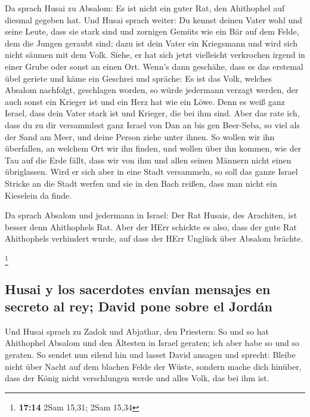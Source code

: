  Da sprach Husai zu Absalom: Es ist nicht ein guter Rat,
den Ahithophel auf diesmal gegeben hat.  Und Husai sprach
weiter: Du kennst deinen Vater wohl und seine Leute, dass sie stark sind
und zornigen Gemüts wie ein Bär auf dem Felde, dem die Jungen geraubt
sind; dazu ist dein Vater ein Kriegsmann und wird sich nicht säumen mit
dem Volk.  Siehe, er hat sich jetzt vielleicht verkrochen
irgend in einer Grube oder sonst an einen Ort. Wenn's dann geschähe,
dass es das erstemal übel geriete und käme ein Geschrei und spräche: Es
ist das Volk, welches Absalom nachfolgt, geschlagen worden,
 so würde jedermann verzagt werden, der auch sonst ein
Krieger ist und ein Herz hat wie ein Löwe. Denn es weiß ganz Israel,
dass dein Vater stark ist und Krieger, die bei ihm sind. 
Aber das rate ich, dass du zu dir versammlest ganz Israel von Dan an bis
gen Beer-Seba, so viel als der Sand am Meer, und deine Person ziehe
unter ihnen.  So wollen wir ihn überfallen, an welchem
Ort wir ihn finden, und wollen über ihn kommen, wie der Tau auf die Erde
fällt, dass wir von ihm und allen seinen Männern nicht einen
übriglassen.  Wird er sich aber in eine Stadt versammeln,
so soll das ganze Israel Stricke an die Stadt werfen und sie in den Bach
reißen, dass man nicht ein Kieselein da finde.

 Da sprach Absalom und jedermann in Israel: Der Rat
Husais, des Arachiten, ist besser denn Ahithophels Rat. Aber der HErr
schickte es also, dass der gute Rat Ahithophels verhindert wurde, auf
dass der HErr Unglück über Absalom brächte.

\footnote{\textbf{17:14} 2Sam 15,31; 2Sam 15,34}

\hypertarget{husai-y-los-sacerdotes-envuxedan-mensajes-en-secreto-al-rey-david-pone-sobre-el-jorduxe1n}{%
\subsection{Husai y los sacerdotes envían mensajes en secreto al rey;
David pone sobre el
Jordán}\label{husai-y-los-sacerdotes-envuxedan-mensajes-en-secreto-al-rey-david-pone-sobre-el-jorduxe1n}}

 Und Husai sprach zu Zadok und Abjathar, den Priestern:
So und so hat Ahithophel Absalom und den Ältesten in Israel geraten; ich
aber habe so und so geraten.  So sendet nun eilend hin
und lasset David ansagen und sprecht: Bleibe nicht über Nacht auf dem
blachen Felde der Wüste, sondern mache dich hinüber, dass der König
nicht verschlungen werde und alles Volk, das bei ihm ist.

